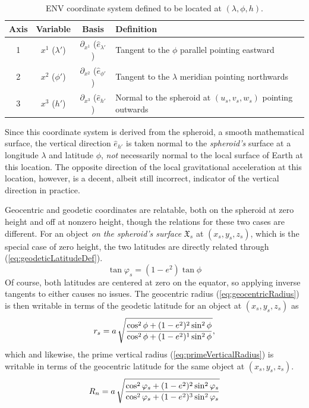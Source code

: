 \documentclass[11pt,dvipsnames]{thesis}
\begin{document}
\begin{table}[H]
\centering
\caption{ENV coordinate system defined to be located at $(\lambda, \phi, h)$.}
\label{tab:ENV}
\begin{tabular}{SSSl}
\toprule
{Axis} & {Variable} & {Basis} & {Definition} \\ \midrule
{1} & {$x^1$ ($\lambda'$)} & {$\partial_{x^1}$ ($\hat{e}_{\lambda'}$)} & {Tangent to the $\phi$ parallel pointing eastward} \\
{2} & {$x^2$ ($\phi'$)} & {$\partial_{x^2}$ ($\hat{e}_{\phi'}$)} & {Tangent to the $\lambda$ meridian pointing northwards} \\
{3} & {$x^3$ ($h'$)} & {$\partial_{x^3}$ ($\hat{e}_{h'}$)} & {Normal to the spheroid at $(u_s, v_s, w_s)$ pointing outwards} \\ \bottomrule
\end{tabular}
\end{table}

Since this coordinate system is derived from the spheroid, a smooth mathematical surface, the vertical direction $\hat{e}_{h'}$ is taken normal to the \textit{spheroid's} surface at a longitude $\lambda$ and latitude $\phi$, \textit{not} necessarily normal to the local surface of Earth at this location. The opposite direction of the local gravitational acceleration at this location, however, is a decent, albeit still incorrect, indicator of the vertical direction in practice. 

Geocentric and geodetic coordinates are relatable, both on the spheroid at zero height and off at nonzero height, though the relations for these two cases are different. For an object \textit{on the spheroid's surface} $\mathfrak{X}_s$ at $(x_s, y_s, z_s)$, which is the special case of zero height, the two latitudes are directly related through (\ref{eq:geodeticLatitudeDef}).
\begin{equation}
\tan\varphi_s = (1 - e^2)\tan\phi
\end{equation}
Of course, both latitudes are centered at zero on the equator, so applying inverse tangents to either causes no issues. The geocentric radius (\ref{eq:geocentricRadius}) is then writable in terms of the geodetic latitude for an object at $(x_s, y_s, z_s)$ as
\begin{equation}
r_s = a \,\sqrt{\frac{\cos^2\phi + (1 - e^2)^2 \,\smash{\sin}^2\,\phi}{\cos^2\phi + (1 - e^2)^1\,\smash{\sin}^2\,\phi}},
\end{equation}
which 
and likewise, the prime vertical radius (\ref{eq:primeVerticalRadius}) is writable in terms of the geocentric latitude for the same object at $(x_s, y_s, z_s)$.
\begin{equation}
R_n = a \, \sqrt{\frac{\cos^2\varphi_s + (1 - e^2)^2 \,\smash{\sin}^2\,\varphi_s}{\cos^2\varphi_s + (1-e^2)^3 \,\smash{\sin}^2\,\varphi_s}}
\end{equation}
\end{document}

